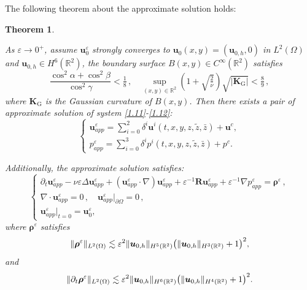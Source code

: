 \documentclass[pdflatex,sn-mathphys-num]{sn-jnl}%
\theoremstyle{thmstyleone}%
\newtheorem{theorem}{Theorem}%
\theoremstyle{thmstyletwo}%
\theoremstyle{thmstylethree}%
\theoremstyle{thmstyletwo}
\begin{document}
The following theorem about the approximate solution holds:
\begin{theorem}\label{thapp}

As $\varepsilon\rightarrow 0^+$, assume $\boldsymbol{u}_0^\varepsilon$ strongly converges to ${\boldsymbol{u}}_0 (x,y)= ({\boldsymbol{u}}_{0,h}, 0)$ in $L^2(\Omega)$ and ${\boldsymbol{u}}_{0,h}\in H^6(\mathbb{R}^2)$, the boundary surface $B(x,y)\in C^\infty(\mathbb{R}^2)$ satisfies 	
	\begin{equation}\label{+16}
		\frac{\cos^2\alpha+\cos^2\beta}{\cos^2\gamma}<\tfrac{1}{8}\,,
		\quad  
		\sup\limits_{(x,y)\in \mathbb{R}^2} (1+\sqrt{\tfrac{2}{\nu}})\sqrt{\big| \boldsymbol{K}_{\mathrm{G}}\big|} <\tfrac{8}{9}\,,
	\end{equation}
where   $\boldsymbol{K}_{\mathrm{G}}$ is  the Gaussian curvature of $B(x,y)$.
Then there exists a pair of approximate solution of system \eqref{1.11}-\eqref{1.12}:
	\begin{equation}\label{1.16}
		\begin{cases}
			\boldsymbol{u}_{app}^{\varepsilon}=\sum\limits_{i=0}^{2}{\delta}^i
			 \boldsymbol u^{i}(t,x,y,z,\tilde z,\bar{z}) 
			+\boldsymbol u^{c},\\
			{p}_{app}^{\varepsilon}=\sum\limits_{i=0}^{3}{\delta}^i
			  p^{i}(t,x,y,z,\tilde z,\bar{z}) 
			+p^{c}.
		\end{cases}
	\end{equation}

	Additionally, the approximate solution satisfies:
	\begin{equation}\label{1.19}
		\begin{cases}
			\partial_{t} {\boldsymbol u}_{app}^{\varepsilon}-\nu\varepsilon\Delta{\boldsymbol u}_{app}^{\varepsilon}+({\boldsymbol u}_{app}^{\varepsilon} \cdot \nabla) {\boldsymbol u}_{app}^{\varepsilon}+\varepsilon^{-1}\boldsymbol{R} {\boldsymbol u}_{app}^{\varepsilon}
			+\varepsilon^{-1}\nabla{p}_{app}^{\varepsilon}=\boldsymbol \rho^{\varepsilon}\,,\\
			\nabla\cdot {\boldsymbol u}_{app}^{\varepsilon}=0\,,\quad
			{\boldsymbol u}_{app}^{\varepsilon}|_{\partial\Omega}=0\,,\\
			{\boldsymbol u}_{app}^{\varepsilon}|_{t=0}=\boldsymbol{u}_0^\varepsilon,
		\end{cases}
	\end{equation}
	where $\boldsymbol \rho^{\varepsilon}$ satisfies
	\begin{equation*}
		\lVert
		\boldsymbol \rho^{\varepsilon}\rVert_{{L}^{2}(\Omega)}
		\lesssim
		\varepsilon^2
		\lVert
		{\boldsymbol{u}}_{0,h}
		\rVert_{{H}^{5}(\mathbb{R}^2)}
		\big(
		\lVert
		{\boldsymbol{u}}_{0,h}
		\rVert_{{H}^{3}(\mathbb{R}^2)}
		+1\big)^2
		\notag,
	\end{equation*}	
	and
	\begin{equation*}
		\lVert
		\partial_t\boldsymbol \rho^{\varepsilon}\rVert_{{L}^{2}(\Omega)}
		\lesssim
		\varepsilon^2
		\lVert
		{\boldsymbol{u}}_{0,h}
		\rVert_{{H}^{6}(\mathbb{R}^2)}
		\big(
		\lVert
		{\boldsymbol{u}}_{0,h}
		\rVert_{{H}^{4}(\mathbb{R}^2)}
		+1
		\big)^2
		\notag.
	\end{equation*}	
\end{theorem}
\end{document}
